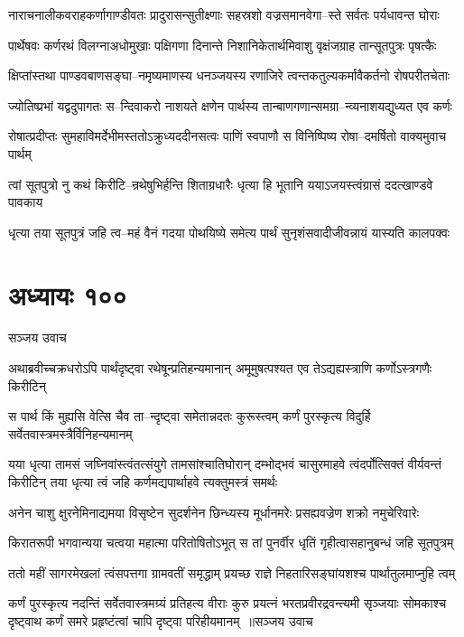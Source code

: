 \twolineshloka
{नाराचनालीकवराहकर्णागाण्डीवतः प्रादुरासन्सुतीक्ष्णाः}
{सहस्रशो वज्रसमानवेगा--स्ते सर्वतः पर्यधावन्त घोराः}


\twolineshloka
{पार्थेषवः कर्णरथं विलग्नाअधोमुखाः पक्षिगणा दिनान्ते}
{निशानिकेतार्थमिवाशु वृक्षंजग्राह तान्सूतपुत्रः पृषत्कैः}


\twolineshloka
{क्षिप्तांस्तथा पाण्डवबाणसङ्घा--नमृष्यमाणस्य धनञ्जयस्य}
{रणाजिरे त्वन्तकतुल्यकर्मावैकर्तनो रोषपरीतचेताः}


\twolineshloka
{ज्योतिष्प्रभां यद्वदुपागतः स--न्दिवाकरो नाशयते क्षणेन}
{पार्थस्य तान्बाणगणान्समग्रा--न्व्यनाशयद्युध्यत एव कर्णः}


\twolineshloka
{रोषात्प्रदीप्तः सुमहाविमर्देभीमस्ततोऽक्रुध्यददीनसत्वः}
{पाणिं स्वपाणौ स विनिष्पिष्य रोषा--दमर्षितो वाक्यमुवाच पार्थम्}


\twolineshloka
{त्वां सूतपुत्रो नु कथं किरीटि--न्रथेषुभिर्हन्ति शिताग्रधारैः}
{धृत्या हि भूतानि ययाऽजयस्त्वंग्रासं ददत्खाण्डवे पावकाय}


\twolineshloka
{धृत्या तया सूतपुत्रं जहि त्व--महं वैनं गदया पोथयिष्ये}
{समेत्य पार्थं सुनृशंसवादीजीवन्नायं यास्यति कालपक्वः}


\chapter{अध्यायः १००}
\twolineshloka
{सञ्जय उवाच}
{}


\twolineshloka
{अथाब्रवीच्चक्रधरोऽपि पार्थंदृष्ट्वा रथेषून्प्रतिहन्यमानान्}
{अमूमुषत्पश्यत एव तेऽद्यह्यस्त्राणि कर्णोऽस्त्रगणैः किरीटिन्}


\twolineshloka
{स पार्थ किं मुह्यसि वेत्सि चैव ता--न्दृष्ट्वा समेतान्नदतः कुरूस्त्वम्}
{कर्णं पुरस्कृत्य विदुर्हि सर्वेतवास्त्रमस्त्रैर्विनिहन्यमानम्}


\threelineshloka
{यया धृत्या तामसं जघ्निवांस्त्वंतत्संयुगे तामसांश्चातिघोरान्}
{दम्भोद्भवं चासुरमाहवे त्वंदर्पोत्सिक्तं वीर्यवन्तं किरीटिन्}
{तया धृत्या त्वं जहि कर्णमद्यपार्थाहवे त्यक्तुमस्त्रं समर्थः}


\twolineshloka
{अनेन चाशु क्षुरनेमिनाद्यमया विसृष्टेन सुदर्शनेन}
{छिन्ध्यस्य मूर्धानमरेः प्रसह्यवज्रेण शक्रो नमुचेरिवारेः}


\twolineshloka
{किरातरूपी भगवान्यया चत्वया महात्मा परितोषितोऽभूत्}
{स तां पुनर्वीर धृतिं गृहीत्वासहानुबन्धं जहि सूतपुत्रम्}


\twolineshloka
{ततो महीं सागरमेखलां त्वंसपत्तगा ग्रामवतीं समृद्धाम्}
{प्रयच्छ राज्ञे निहतारिसङ्घांयशश्च पार्थातुलमाप्नुहि त्वम्}


\fourlineindentedshloka
{कर्णं पुरस्कृत्य नदन्तिं सर्वेतवास्त्रमग्र्यं प्रतिहत्य वीराः}
{कुरु प्रयत्नं भरतप्रवीरद्रवन्त्यमी सृञ्जयाः सोमकाश्च}
{दृष्ट्वाथ कर्णं समरे प्रहृष्टंत्वां चापि दृष्ट्वा परिहीयमानम् ॥सञ्जय उवाच}
{}


